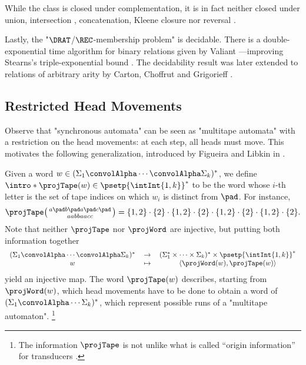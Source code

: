 While the class is closed under complementation, it is in fact neither closed under union,
intersection \cite[Theorem~17]{RabinScott1959FiniteAutomata},
concatenation, Kleene closure nor reversal
\cite[Table~1]{FischerRosenberg1968Multitape}.

Lastly, the "$\DRAT$/$\REC$-membership problem" is decidable.
There is a double-exponential time algorithm for binary relations
given by Valiant \cite{Valiant1975RegularityDeterministicPushdown}---improving Stearns's
triple-exponential bound \cite{Stearns1967RegularityPushdown}.
The decidability result was later extended to relations of arbitrary arity by Carton, Choffrut and 
Grigorieff \cite[Theorem 3.7]{CartonChoffrutGrigorieff2006DecisionProblems}.

\subsection{Restricted Head Movements}
\label{sec:preliminaries-automatic-structures-relations-restricted-head-movements}

Observe that "synchronous automata" can be seen as "multitape automata" with
a restriction on the head movements: at each step, all heads must move.
This motivates the following generalization, introduced by Figueira and Libkin in
\cite{FigueiraLibkin2015SynchronizingRelations}.

Given a word $w \in (\Sigma_1 \convolAlpha \cdots \convolAlpha \Sigma_k)^*$,
we define \AP$\intro*\projTape(w) \in \psetp{\intInt{1,k}}^*$ to be the word
whose $i$-th letter is the set of tape indices on which $w_i$ is distinct from $\pad$. 
For instance,
\[
	\projTape\pair{a \pad b \pad a \pad c \pad}{a a b b a a c c}
	= \{1,2\} \cdot \{2\} \cdot \{1,2\} \cdot \{2\} \cdot \{1,2\} \cdot \{2\} \cdot \{1,2\} \cdot \{2\}.
\]
Note that neither $\projTape$ nor $\projWord$ are injective, but putting both information together 
\[
	\begin{tabular}{ccc}
		$(\Sigma_1 \convolAlpha \cdots \convolAlpha \Sigma_k)^*$ & $\to$
			& $(\Sigma_1^* \times \cdots \times \Sigma_k)^* \times \psetp{\intInt{1,k}}^*$\\
		$w$ & $\mapsto$ & $\tup{\projWord(w), \projTape(w)}$
	\end{tabular}
\]
yield an injective map.
The word $\projTape(w)$ describes, starting from $\projWord(w)$, which 
head movements have to be done to obtain a word of $(\Sigma_1 \convolAlpha \cdots \Sigma_k)^*$, which represent possible runs of a "multitape automaton".%
\footnote{The information $\projTape$ is not unlike what is called
``origin information'' for transducers \cite{Bojanczyk2014TransducersOriginInformation}.}

